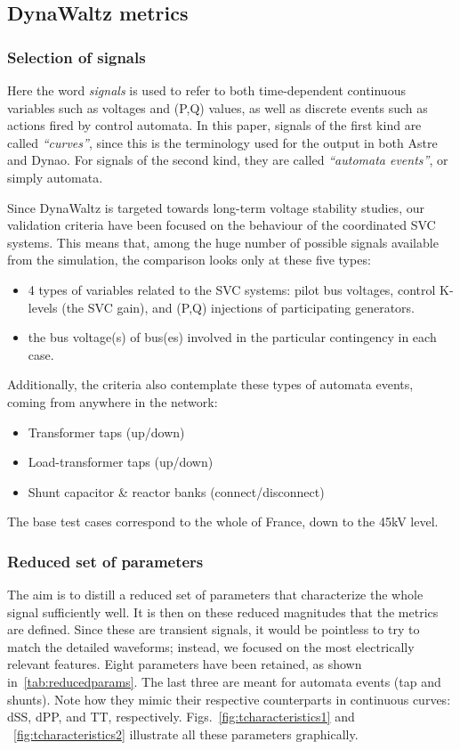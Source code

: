 \documentclass[conference]{IEEEtran}
\newcommand{\Dynawo}{Dyna\textomega o} %
\begin{document}
\subsection{DynaWaltz metrics}

\subsubsection{Selection of signals}
Here the word \emph{signals} is used to refer to both time-dependent continuous
variables such as voltages and (P,Q) values, as well as discrete events such as
actions fired by control automata. In this paper, signals of the
first kind are called \emph{``curves''}, since this is the terminology used for the
output in both Astre and \Dynawo. For signals of the second kind, they are
called \emph{``automata events''}, or simply automata.

Since DynaWaltz is targeted towards long-term voltage stability studies, our
validation criteria have been focused on the behaviour of the coordinated SVC systems. This means that, among the huge number
of possible signals available from the simulation, the comparison looks only at
these five types:
\begin{itemize}
  \item 4 types of variables related to the SVC systems: pilot bus voltages,
        control K-levels (the SVC gain), and (P,Q) injections of participating
        generators.
  \item the bus voltage(s) of bus(es) involved in the particular
        contingency in each case.
\end{itemize}
Additionally, the criteria also contemplate these types of automata events,
coming from anywhere in the network:
\begin{itemize}
  \item Transformer taps (up/down)
  \item Load-transformer taps (up/down)
  \item Shunt capacitor \& reactor banks (connect/disconnect)
\end{itemize}
The base test cases correspond to the whole of France, down to the 45kV
level.


\subsubsection{Reduced set of parameters}
The aim is to distill a reduced set of parameters that characterize the whole
signal sufficiently well. It is then on these reduced
magnitudes that the metrics are defined.  Since these are transient signals,
it would be pointless to try to match the detailed waveforms; instead, we
focused on the most electrically relevant features.  Eight parameters have been retained, as shown
in~\ref{tab:reducedparams}. The last three are meant for automata events (tap
and shunts). Note how they mimic their respective counterparts in continuous
curves: dSS, dPP, and TT, respectively. Figs.~\ref{fig:tcharacteristics1} and
~\ref{fig:tcharacteristics2} illustrate all these parameters graphically.
\end{document}
